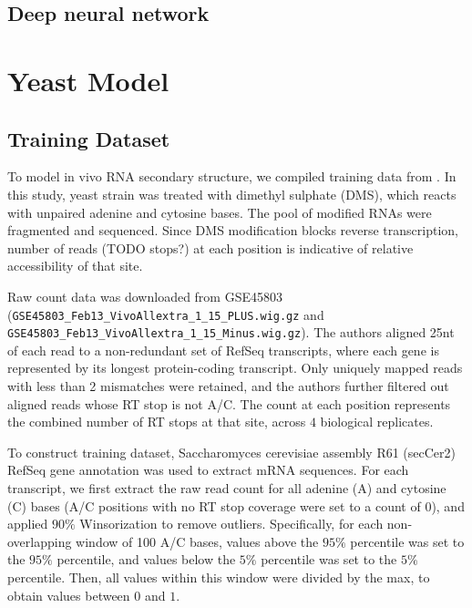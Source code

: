 \documentclass{proposal}
\begin{document}
%
%
%
%
%
%
%



\section{Deep neural network}

%
%

\chapter{Yeast Model}

\section{Training Dataset}

To model in vivo RNA secondary structure, we compiled training data from \cite{rouskin2014genome}.
In this study, yeast strain was treated with ﻿dimethyl sulphate (DMS), which reacts with ﻿unpaired adenine and cytosine bases.
The pool of modified RNAs were fragmented and sequenced.
Since ﻿DMS modification blocks reverse transcription, ﻿
number of reads (TODO stops?) at each position is indicative of relative accessibility of that site.

Raw count data was downloaded from GSE45803 (\verb|GSE45803_Feb13_VivoAllextra_1_15_PLUS.wig.gz| and \verb|GSE45803_Feb13_VivoAllextra_1_15_Minus.wig.gz|).
The authors aligned 25nt of each read to a non-redundant set of RefSeq transcripts,
where each gene is represented by its longest protein-coding transcript.
Only uniquely mapped reads with less than 2 mismatches were retained,
and the authors further filtered out aligned reads whose RT stop is not A/C.
The count at each position represents the combined number of RT stops at that site, across $4$ biological replicates.

To construct training dataset, Saccharomyces cerevisiae assembly R61 (secCer2) RefSeq gene annotation was used to extract mRNA sequences.
For each transcript, we first extract the raw read count for all adenine (A) and cytosine (C) bases
(A/C positions with no RT stop coverage were set to a count of $0$),
and applied ﻿$90\%$ Winsorization to remove outliers.
Specifically, for each non-overlapping window of 100 A/C bases, values above the $95\%$ percentile was set to the $95\%$ percentile,
and values below the $5\%$ percentile was set to the $5\%$ percentile.
Then, all values within this window were divided by the max, to obtain values between $0$ and $1$.
\end{document}
